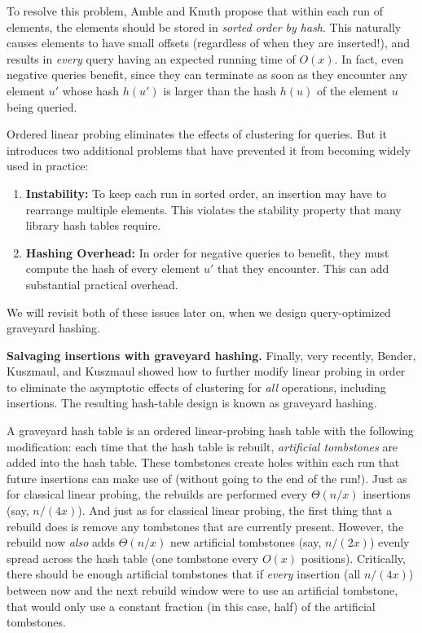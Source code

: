 \documentclass[10pt]{article}
\theoremstyle{remark}
\theoremstyle{remark}
\renewcommand{\paragraph}[1]{\vspace{.2 cm} \noindent \textbf{#1}}
\begin{document}
To resolve this problem, Amble and Knuth propose that within each run of elements, the elements should be stored in \emph{sorted order by hash}. This naturally causes elements to have small offsets (regardless of when they are inserted!), and results in \emph{every} query having an expected running time of $O(x)$. In fact, even negative queries benefit, since they can terminate as soon as they encounter any element $u'$ whose hash $h(u')$ is larger than the hash $h(u)$ of the element $u$ being queried.

Ordered linear probing eliminates the effects of clustering for queries. But it introduces two additional problems that have prevented it from becoming widely used in practice:
\begin{enumerate}
    \item \textbf{Instability: }To keep each run in sorted order, an insertion may have to rearrange multiple elements. This violates the stability property that many library hash tables require.
    \item \textbf{Hashing Overhead:} In order for negative queries to benefit, they must compute the hash of every element $u'$ that they encounter. This can add substantial practical overhead.
\end{enumerate}

We will revisit both of these issues later on, when we design query-optimized graveyard hashing.

\paragraph{Salvaging insertions with graveyard hashing.} Finally, very recently, Bender, Kuszmaul, and Kuszmaul \cite{??} showed how to further modify linear probing in order to eliminate the asymptotic effects of clustering for \emph{all} operations, including insertions. The resulting hash-table design is known as graveyard hashing.

A graveyard hash table is an ordered linear-probing hash table with the following modification: each time that the hash table is rebuilt, \emph{artificial tombstones} are added into the hash table. These tombstones create holes within each run that future insertions can make use of (without going to the end of the run!). Just as for classical linear probing, the rebuilds are performed every $\Theta(n/x)$ insertions (say, $n/(4x)$). And just as for classical linear probing, the first thing that a rebuild does is remove any tombstones that are currently present. However, the rebuild now \emph{also} adds $\Theta(n/x)$ new artificial tombstones (say, $n/(2x)$) evenly spread across the hash table (one tombstone every $O(x)$ positions). Critically, there should be enough artificial tombstones that if \emph{every} insertion (all $n/(4x)$) between now and the next rebuild window were to use an artificial tombstone, that would only use a constant fraction (in this case, half) of the artificial tombstones.
\end{document}
